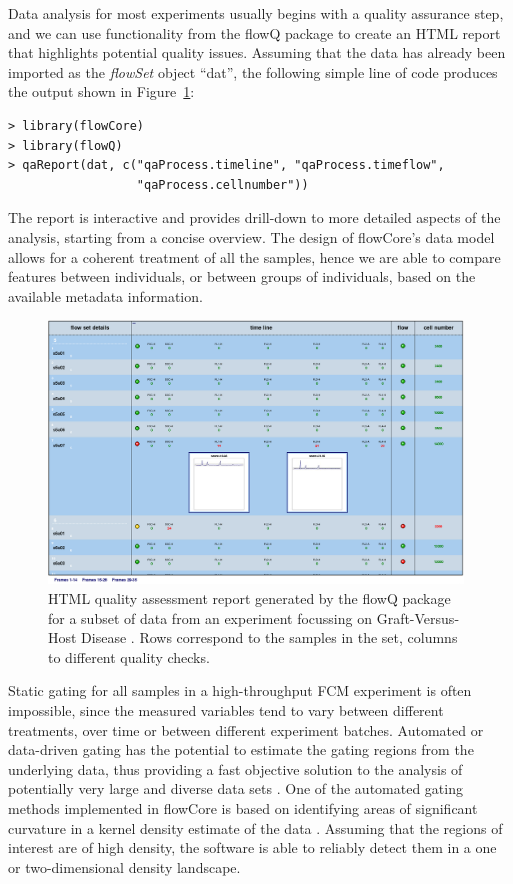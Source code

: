 \documentclass[12pt]{article}
\newcommand{\Rpackage}[1]{{\textsf{#1}}}
\newcommand{\Rclass}[1]{{\textit{#1}}}
\begin{document}
Data analysis for most experiments usually begins with a quality
assurance step, and we can use functionality from the \Rpackage{flowQ}
package to create an HTML report that highlights potential quality
issues. Assuming that the data has already been imported as the
\Rclass{flowSet} object ``dat'', the following simple line of code
produces the output shown in Figure~\ref{flowQ}:

\begin{verbatim}
> library(flowCore)
> library(flowQ)
> qaReport(dat, c("qaProcess.timeline", "qaProcess.timeflow", 
                  "qaProcess.cellnumber"))
\end{verbatim}

The report is interactive and provides drill-down to more detailed
aspects of the analysis, starting from a concise overview. The design of \Rpackage{flowCore}'s data model
allows for a coherent treatment of all the samples, hence we are able
to compare features between individuals, or between groups of
individuals, based on the available metadata information.


\begin{singlespace}
\begin{figure}[htbp]
\centering
\includegraphics[width=0.98\textwidth]{flowQ.jpg}
\caption{\label{flowQ}%
  HTML quality assessment report generated by the flowQ package for a
  subset of data from an experiment focussing on Graft-Versus-Host
  Disease \citep{brinkman2007hcf}. Rows correspond to the samples in
  the set, columns to different quality checks.}
\end{figure}
\end{singlespace}

Static gating for all samples in a high-throughput FCM experiment is
often impossible, since the measured variables tend to vary between
different treatments, over time or between different experiment
batches. Automated or data-driven gating has the potential to estimate
the gating regions from the underlying data, thus providing a fast
objective solution to the analysis of potentially very large and
diverse data sets \citep{lo2008agf}. One of the automated gating
methods implemented in \Rpackage{flowCore} is based on identifying
areas of significant curvature in a kernel density estimate of the
data \citep{wand2008}. Assuming that the regions of interest are of
high density, the software is able to reliably detect them in a one or
two-dimensional density landscape.
\end{document}
